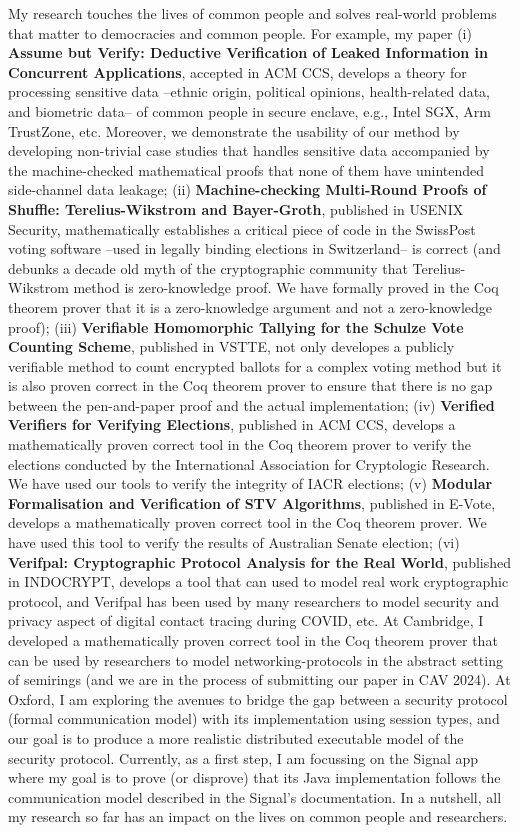 \documentclass[11pt,a4paper,roman]{moderncv}
\begin{document}
My research touches the lives of common people and solves 
real-world problems that matter to democracies and common people. For example, my paper (i)
\textbf{Assume but Verify: Deductive Verification of Leaked Information in Concurrent Applications},
accepted in ACM CCS, develops a theory 
for processing sensitive data --ethnic origin, political opinions,
health-related data, and  biometric data-- of common 
people in secure enclave, e.g., Intel SGX, Arm TrustZone, etc. Moreover, 
we demonstrate the usability of our method by developing non-trivial case studies that handles 
sensitive data accompanied by the machine-checked mathematical proofs that none of 
them have unintended side-channel data leakage; 
(ii) \textbf{Machine-checking Multi-Round Proofs of Shuffle: Terelius-Wikstrom and Bayer-Groth}, 
published in USENIX Security, mathematically establishes a critical piece of 
code in the SwissPost voting software --used in legally binding 
elections in Switzerland-- is correct (and debunks a decade old myth of the cryptographic 
community that Terelius-Wikstrom method is zero-knowledge proof. We have formally 
proved in the Coq theorem prover that it is a zero-knowledge argument and not 
a zero-knowledge proof);
(iii) \textbf{Verifiable Homomorphic Tallying for the Schulze Vote Counting Scheme}, published 
in VSTTE, not only developes a publicly verifiable method to count encrypted ballots for 
a complex voting method but it 
is also proven correct in the Coq theorem prover to ensure that there is no gap between 
the pen-and-paper proof and the actual implementation;  (iv) \textbf{Verified Verifiers for 
Verifying Elections}, published in ACM CCS, develops a mathematically proven correct tool 
in the Coq theorem prover to verify the elections conducted by 
the International Association for Cryptologic Research. We have used 
our tools to verify the integrity of IACR elections; (v) \textbf{Modular Formalisation and 
Verification of STV Algorithms}, published in E-Vote, develops a mathematically proven 
correct tool in the Coq theorem prover. We have used this tool to verify
the results of Australian Senate election; 
(vi) \textbf{Verifpal: Cryptographic Protocol Analysis for the Real World}, published in 
INDOCRYPT, develops a tool that can used to model real work cryptographic protocol, and 
Verifpal has been used by many researchers to model security and privacy aspect of 
digital contact tracing during COVID, etc.
At Cambridge, I developed a mathematically proven correct tool in the Coq theorem prover 
that can be used by researchers to model networking-protocols in the abstract 
setting of semirings (and we are in the process of submitting our paper in CAV 2024).
At Oxford, I am exploring the avenues to bridge the gap between a security protocol 
(formal communication model) with its implementation using session types, and our 
goal is to produce a more realistic distributed executable model of the security protocol. 
Currently, as a first step, I am focussing on the Signal app 
where my goal is to prove (or disprove) that its Java implementation follows the 
communication model described in the Signal's documentation. 
In a nutshell, all my research so far has an impact on the lives on common people and 
researchers. 
\end{document}
